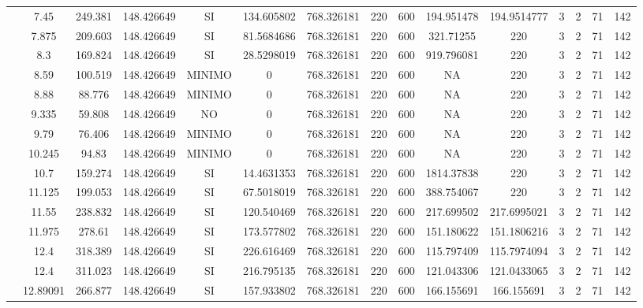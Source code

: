 \begin{table}[H]
{\begin{tabular}{|c|c|c|c|c|c|c|c|c|c|c|c|c|c|c|}
\cline{2-15}    & 7.45 & 249.381 & 148.426649 & SI  & 134.605802 & 768.326181 & 220 & 600 & 194.951478 & 194.9514777 & 3   & 2   & 71  & 142 \bigstrut\\
\cline{2-15}    & 7.875 & 209.603 & 148.426649 & SI  & 81.5684686 & 768.326181 & 220 & 600 & 321.71255 & 220 & 3   & 2   & 71  & 142 \bigstrut\\
\cline{2-15}    & 8.3 & 169.824 & 148.426649 & SI  & 28.5298019 & 768.326181 & 220 & 600 & 919.796081 & 220 & 3   & 2   & 71  & 142 \bigstrut\\
\cline{2-15}    & 8.59 & 100.519 & 148.426649 & MINIMO & 0   & 768.326181 & 220 & 600 & NA  & 220 & 3   & 2   & 71  & 142 \bigstrut\\
\cline{2-15}    & 8.88 & 88.776 & 148.426649 & MINIMO & 0   & 768.326181 & 220 & 600 & NA  & 220 & 3   & 2   & 71  & 142 \bigstrut\\
\cline{2-15}    & 9.335 & 59.808 & 148.426649 & NO  & 0   & 768.326181 & 220 & 600 & NA  & 220 & 3   & 2   & 71  & 142 \bigstrut\\
\cline{2-15}    & 9.79 & 76.406 & 148.426649 & MINIMO & 0   & 768.326181 & 220 & 600 & NA  & 220 & 3   & 2   & 71  & 142 \bigstrut\\
\cline{2-15}    & 10.245 & 94.83 & 148.426649 & MINIMO & 0   & 768.326181 & 220 & 600 & NA  & 220 & 3   & 2   & 71  & 142 \bigstrut\\
\cline{2-15}    & 10.7 & 159.274 & 148.426649 & SI  & 14.4631353 & 768.326181 & 220 & 600 & 1814.37838 & 220 & 3   & 2   & 71  & 142 \bigstrut\\
\cline{2-15}    & 11.125 & 199.053 & 148.426649 & SI  & 67.5018019 & 768.326181 & 220 & 600 & 388.754067 & 220 & 3   & 2   & 71  & 142 \bigstrut\\
\cline{2-15}    & 11.55 & 238.832 & 148.426649 & SI  & 120.540469 & 768.326181 & 220 & 600 & 217.699502 & 217.6995021 & 3   & 2   & 71  & 142 \bigstrut\\
\cline{2-15}    & 11.975 & 278.61 & 148.426649 & SI  & 173.577802 & 768.326181 & 220 & 600 & 151.180622 & 151.1806216 & 3   & 2   & 71  & 142 \bigstrut\\
\cline{2-15}    & 12.4 & 318.389 & 148.426649 & SI  & 226.616469 & 768.326181 & 220 & 600 & 115.797409 & 115.7974094 & 3   & 2   & 71  & 142 \bigstrut\\
\cline{2-15}    & 12.4 & 311.023 & 148.426649 & SI  & 216.795135 & 768.326181 & 220 & 600 & 121.043306 & 121.0433065 & 3   & 2   & 71  & 142 \bigstrut\\
\cline{2-15}    & 12.89091 & 266.877 & 148.426649 & SI  & 157.933802 & 768.326181 & 220 & 600 & 166.155691 & 166.155691 & 3   & 2   & 71  & 142 \bigstrut\\

\end{tabular}}
\end{table}
